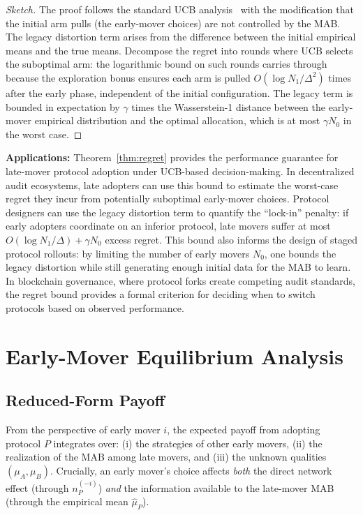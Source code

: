 \documentclass[12pt,a4paper]{article}
\begin{document}
\begin{proof}[Sketch]
The proof follows the standard UCB analysis~\citep{auer2002finite} with the
modification that the initial arm pulls (the early-mover choices) are not
controlled by the MAB.  The legacy distortion term arises from the
difference between the initial empirical means and the true means.
Decompose the regret into rounds where UCB selects the suboptimal arm:
the logarithmic bound on such rounds carries through because the exploration
bonus ensures each arm is pulled $O(\log N_1/\Delta^2)$ times after the
early phase, independent of the initial configuration.  The legacy term is
bounded in expectation by $\gamma$ times the Wasserstein-1 distance between
the early-mover empirical distribution and the optimal allocation, which is
at most $\gamma N_0$ in the worst case.
\end{proof}

\medskip\noindent
\textbf{Applications:}
Theorem~\ref{thm:regret} provides the performance guarantee for late-mover
protocol adoption under UCB-based decision-making.  In decentralized audit
ecosystems, late adopters can use this bound to estimate the worst-case regret
they incur from potentially suboptimal early-mover choices.  Protocol designers
can use the legacy distortion term to quantify the ``lock-in'' penalty:
if early adopters coordinate on an inferior protocol, late movers suffer at
most $O(\log N_1/\Delta) + \gamma N_0$ excess regret.  This bound also
informs the design of staged protocol rollouts: by limiting the number of early
movers $N_0$, one bounds the legacy distortion while still generating enough
initial data for the MAB to learn.  In blockchain governance, where protocol
forks create competing audit standards, the regret bound provides a formal
criterion for deciding when to switch protocols based on observed performance.

\section{Early-Mover Equilibrium Analysis}

\subsection{Reduced-Form Payoff}

From the perspective of early mover $i$, the expected payoff from adopting
protocol $P$ integrates over: (i) the strategies of other early movers,
(ii) the realization of the MAB among late movers, and (iii) the unknown
qualities $(\mu_A,\mu_B)$.  Crucially, an early mover's choice affects
\emph{both} the direct network effect (through $n_P^{(-i)}$) \emph{and} the
information available to the late-mover MAB (through the empirical mean
$\hat{\mu}_P$).
\end{document}
